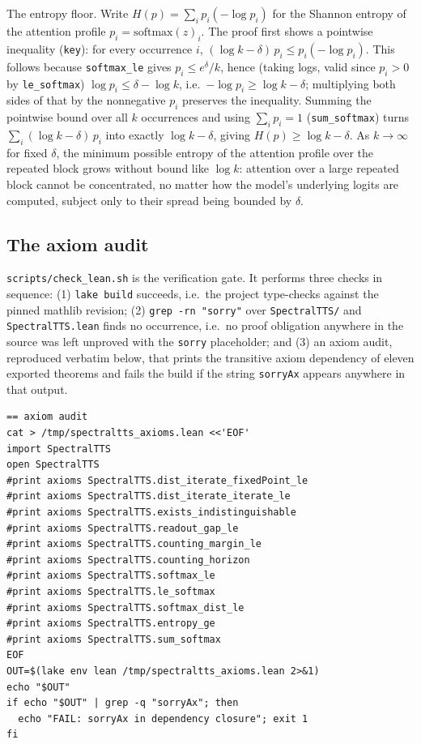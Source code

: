 \documentclass[11pt]{article}
\begin{document}
The entropy floor. Write $H(p) = \sum_i p_i(-\log p_i)$ for the Shannon
entropy of the attention profile $p_i = \mathrm{softmax}(z)_i$. The proof
first shows a pointwise inequality (\texttt{key}): for every occurrence $i$,
$(\log k - \delta)\,p_i \le p_i(-\log p_i)$. This follows because
\texttt{softmax\_le} gives $p_i \le e^{\delta}/k$, hence (taking logs, valid
since $p_i>0$ by \texttt{le\_softmax}) $\log p_i \le \delta - \log k$, i.e.\
$-\log p_i \ge \log k - \delta$; multiplying both sides of that by the
nonnegative $p_i$ preserves the inequality. Summing the pointwise bound over
all $k$ occurrences and using $\sum_i p_i = 1$ (\texttt{sum\_softmax}) turns
$\sum_i (\log k-\delta)\,p_i$ into exactly $\log k - \delta$, giving
$H(p) \ge \log k - \delta$. As $k\to\infty$ for fixed $\delta$, the minimum
possible entropy of the attention profile over the repeated block grows
without bound like $\log k$: attention over a large repeated block cannot be
concentrated, no matter how the model's underlying logits are computed,
subject only to their spread being bounded by $\delta$.

\subsection{The axiom audit}
\label{sec:s1-audit}

\texttt{scripts/check\_lean.sh} is the verification gate. It performs three
checks in sequence: (1) \texttt{lake build} succeeds, i.e.\ the project
type-checks against the pinned mathlib revision; (2) \texttt{grep -rn "sorry"}
over \texttt{SpectralTTS/} and \texttt{SpectralTTS.lean} finds no occurrence,
i.e.\ no proof obligation anywhere in the source was left unproved with the
\texttt{sorry} placeholder; and (3) an axiom audit, reproduced verbatim below,
that prints the transitive axiom dependency of eleven exported theorems and
fails the build if the string \texttt{sorryAx} appears anywhere in that
output.

\begin{lstlisting}[mathescape=false]
== axiom audit
cat > /tmp/spectraltts_axioms.lean <<'EOF'
import SpectralTTS
open SpectralTTS
#print axioms SpectralTTS.dist_iterate_fixedPoint_le
#print axioms SpectralTTS.dist_iterate_iterate_le
#print axioms SpectralTTS.exists_indistinguishable
#print axioms SpectralTTS.readout_gap_le
#print axioms SpectralTTS.counting_margin_le
#print axioms SpectralTTS.counting_horizon
#print axioms SpectralTTS.softmax_le
#print axioms SpectralTTS.le_softmax
#print axioms SpectralTTS.softmax_dist_le
#print axioms SpectralTTS.entropy_ge
#print axioms SpectralTTS.sum_softmax
EOF
OUT=$(lake env lean /tmp/spectraltts_axioms.lean 2>&1)
echo "$OUT"
if echo "$OUT" | grep -q "sorryAx"; then
  echo "FAIL: sorryAx in dependency closure"; exit 1
fi
\end{lstlisting}
\end{document}
